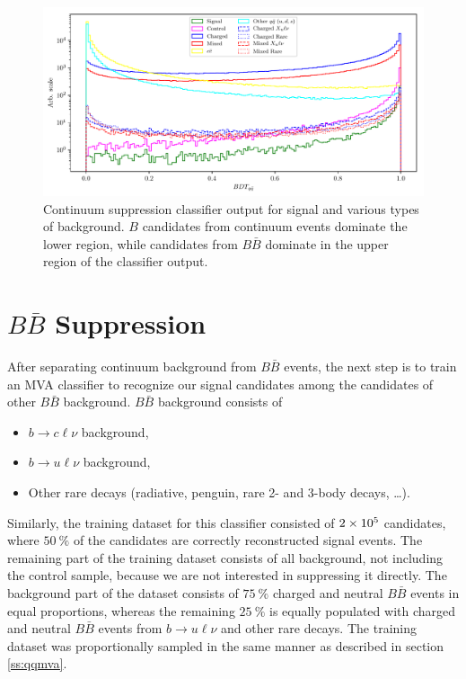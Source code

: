 \begin{figure}[H]
	\centering
	\captionsetup{width=0.8\linewidth}
	\includegraphics[width=\linewidth]{fig/cs_BDT}
	\caption{Continuum suppression classifier output for signal and various types of background. $B$ candidates from continuum events dominate the lower region, while candidates from $B\bar B$ dominate in the upper region of the classifier output.}
	\label{fig:cs_mva}
\end{figure}

\section{\texorpdfstring{$B\bar B$}{BB-bar} Suppression}

After separating continuum background from $B \bar B$ events, the next step is to train an MVA classifier to recognize our signal candidates among the candidates of other $B \bar B$ background. $B \bar B$ background consists of
\begin{itemize}
	\item $b \to c \ell \nu$ background,
	\item $b \to u \ell \nu$ background,
	\item Other rare decays (radiative, penguin, rare 2- and 3-body decays, \dots).
\end{itemize}

Similarly, the training dataset for this classifier consisted of $2\times 10^{5}$ candidates, where $50~\%$ of the candidates are correctly reconstructed signal events. The remaining part of the training dataset consists of all background, not including the control sample, because we are not interested in suppressing it directly. The background part of the dataset consists of $75~\%$ charged and neutral $B \bar B$ events in equal proportions, whereas the remaining $25~\%$ is equally populated with charged and neutral $B \bar B$ events from $b \to u \ell \nu$ and other rare decays. The training dataset was proportionally sampled in the same manner as described in section \ref{ss:qqmva}.

